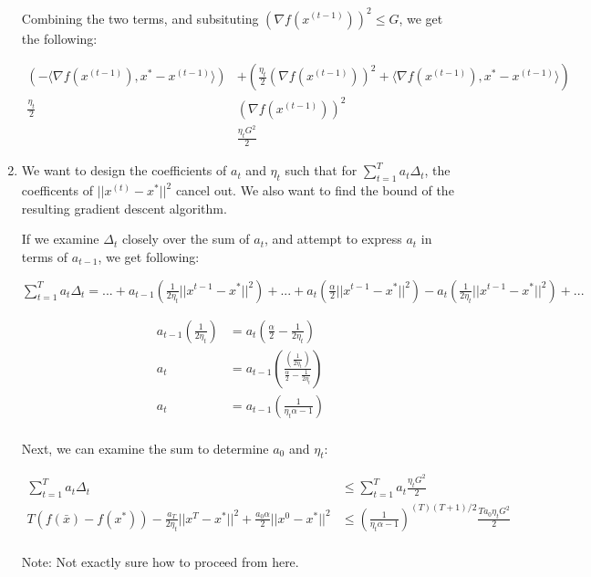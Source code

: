 \documentclass[11pt]{article}
\theoremstyle{definition}
\theoremstyle{case}
\theoremstyle{theorem}
\begin{document}
\begin{enumerate}[label=(\alph*)]
Combining the two terms, and subsituting $(\nabla f(x^{(t-1)}))^2 \leq G$, we get the following:

\begin{align*}
\left(- \langle \nabla f(x^{(t-1)}), x^* -x^{(t-1)} \rangle \right) &+ \left( \frac{\eta_t}{2} (\nabla f(x^{(t-1)}))^2 + \langle \nabla f(x^{(t-1)}), x^* - x^{(t-1)} \rangle \right) \\
\frac{\eta_t}{2} &(\nabla f(x^{(t-1)}))^2 \\
&\frac{\eta_t G^2}{2}
\end{align*}

\item We want to design the coefficients of $a_t$ and $\eta_t$ such that for $\sum_{t=1}^{T} a_t \Delta_t$, the coefficents of $||x^{(t)} - x^*||^2$ cancel out. 
We also want to find the bound of the resulting gradient descent algorithm. 

If we examine $\Delta_t$ closely over the sum of $a_t$, and attempt to express $a_t$ in terms of $a_{t-1}$, we get following:

$\sum_{t=1}^{T} a_t \Delta_t = ... + a_{t-1} \left( \frac{1}{2 \eta_t} || x^{t-1} - x^* ||^2 \right) + ... + a_t \left( \frac{\alpha}{2} || x^{t-1} - x^* ||^2 \right) - a_t \left( \frac{1}{2 \eta_t} || x^{t-1} - x^* ||^2 \right) + ... $

\begin{align*}
a_{t-1} (\frac{1}{2 \eta_t}) &= a_{t} (\frac{\alpha}{2} - \frac{1}{2 \eta_t}) \\
a_{t} &= a_{t-1} \left( \frac{(\frac{1}{2 \eta_t})}{\frac{\alpha}{2} - \frac{1}{2 \eta_t}} \right) \\
a_{t} &= a_{t-1} \left( \frac{1}{\eta_t \alpha - 1}\right) \\
\end{align*}

Next, we can examine the sum to determine $a_0$ and $\eta_t$:

\begin{align*}
\sum_{t=1}^{T} a_t \Delta_t &\leq \sum_{t=1}^{T} a_t \frac{\eta_t G^2}{2} \\
T(f(\bar{x}) - f(x^*)) - \frac{a_T}{2 \eta_t} || x^{T} - x^* ||^2 + \frac{a_0 \alpha}{2} || x^{0} - x^* ||^2 &\leq (\frac{1}{\eta_t \alpha - 1})^{(T)(T+1)/2} \frac{T a_0 \eta_t G^2}{2} \\
\end{align*}

Note: Not exactly sure how to proceed from here.

\end{enumerate}
\end{document}
